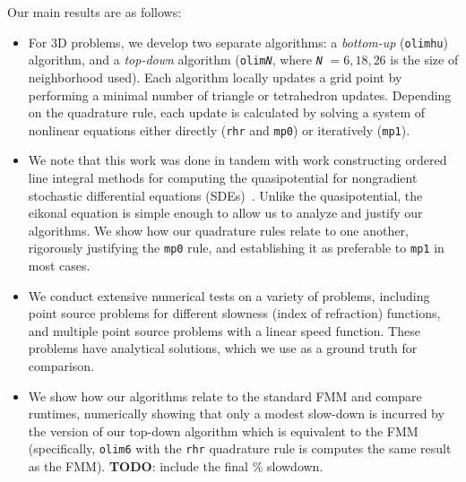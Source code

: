 \documentclass[eikonal.tex]{subfiles}
\begin{document}
Our main results are as follows:
\begin{itemize}
\item For 3D problems, we develop two separate algorithms: a
  \emph{bottom-up} (\texttt{olimhu}) algorithm, and a \emph{top-down}
  algorithm (\texttt{olim\emph{N}}, where \texttt{\emph{N}}
  \hspace{-0.1em}$=6,18,26$ is the size of neighborhood used). Each
  algorithm locally updates a grid point by performing a minimal
  number of triangle or tetrahedron updates. Depending on the
  quadrature rule, each update is calculated by solving a system of
  nonlinear equations either directly (\texttt{rhr} and \texttt{mp0})
  or iteratively (\texttt{mp1}).
\item We note that this work was done in tandem with work constructing
  ordered line integral methods for computing the quasipotential for
  nongradient stochastic differential equations
  (SDEs)~\cite{dahiya2017ordered,yang2018computing,dahiya2018ordered}. Unlike
  the quasipotential, the eikonal equation is simple enough to allow
  us to analyze and justify our algorithms. We show how our quadrature
  rules relate to one another, rigorously justifying the \texttt{mp0}
  rule, and establishing it as preferable to \texttt{mp1} in most
  cases.
\item We conduct extensive numerical tests on a variety of problems,
  including point source problems for different slowness (index of
  refraction) functions, and multiple point source problems with a
  linear speed function. These problems have analytical solutions,
  which we use as a ground truth for comparison.
\item We show how our algorithms relate to the standard FMM and
  compare runtimes, numerically showing that only a modest slow-down
  is incurred by the version of our top-down algorithm which is
  equivalent to the FMM (specifically, \texttt{olim6} with the
  \texttt{rhr} quadrature rule is computes the same result as the
  FMM). \textbf{TODO}: include the final \% slowdown.
\end{itemize}
\end{document}
